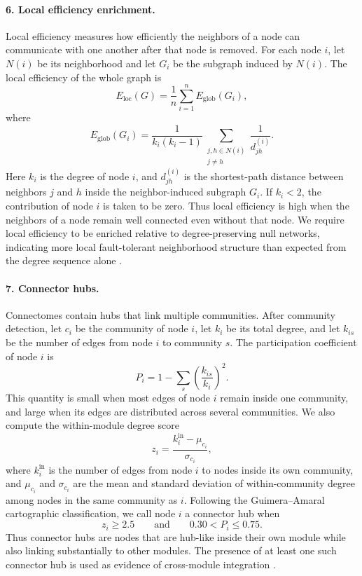 \documentclass[12pt]{article}
\begin{document}
\paragraph{6. Local efficiency enrichment.}
Local efficiency measures how efficiently the neighbors of a node can
communicate with one another after that node is removed. For each node
$i$, let $N(i)$ be its neighborhood and let $G_i$ be the subgraph induced
by $N(i)$. The local efficiency of the whole graph is
\[
E_{\mathrm{loc}}(G)
=
\frac{1}{n}
\sum_{i=1}^{n}
E_{\mathrm{glob}}(G_i),
\]
where
\[
E_{\mathrm{glob}}(G_i)
=
\frac{1}{k_i(k_i-1)}
\sum_{\substack{j,h \in N(i)\\ j\neq h}}
\frac{1}{d^{(i)}_{jh}} .
\]
Here $k_i$ is the degree of node $i$, and $d^{(i)}_{jh}$ is the
shortest-path distance between neighbors $j$ and $h$ inside the
neighbor-induced subgraph $G_i$. If $k_i<2$, the contribution of node
$i$ is taken to be zero. Thus local efficiency is high when the neighbors
of a node remain well connected even without that node. We require local
efficiency to be enriched relative to degree-preserving null networks,
indicating more local fault-tolerant neighborhood structure than expected
from the degree sequence alone \cite{LatoraMarchiori2001}.

\paragraph{7. Connector hubs.}
Connectomes contain hubs that link multiple communities. After community
detection, let $c_i$ be the community of node $i$, let $k_i$ be its total
degree, and let $k_{is}$ be the number of edges from node $i$ to
community $s$. The participation coefficient of node $i$ is
\[
P_i
=
1 -
\sum_s
\left(
\frac{k_{is}}{k_i}
\right)^2 .
\]
This quantity is small when most edges of node $i$ remain inside one
community, and large when its edges are distributed across several
communities. We also compute the within-module degree score
\[
z_i
=
\frac{k_i^{\mathrm{in}}-\mu_{c_i}}{\sigma_{c_i}},
\]
where $k_i^{\mathrm{in}}$ is the number of edges from node $i$ to nodes
inside its own community, and $\mu_{c_i}$ and $\sigma_{c_i}$ are the mean
and standard deviation of within-community degree among nodes in the same
community as $i$. Following the Guimera--Amaral cartographic
classification, we call node $i$ a connector hub when
\[
z_i \geq 2.5
\qquad\text{and}\qquad
0.30 < P_i \leq 0.75 .
\]
Thus connector hubs are nodes that are hub-like inside their own module
while also linking substantially to other modules. The presence of at
least one such connector hub is used as evidence of cross-module
integration \cite{Guimera2005}.
\end{document}
